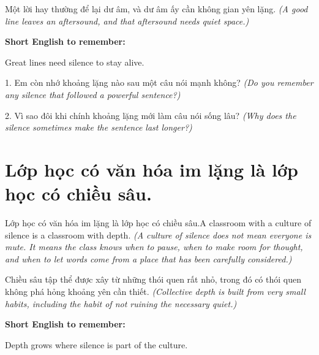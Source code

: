 \begin{baihoc}
Một lời hay thường để lại dư âm, và dư âm ấy cần không gian yên lặng.
\textit{(A good line leaves an aftersound, and that aftersound needs quiet space.)}
\end{baihoc}

\begin{ghinhoanh}
\textbf{Short English to remember:}

Great lines need silence to stay alive.

\end{ghinhoanh}

\begin{tuhocnhanh}
1. Em còn nhớ khoảng lặng nào sau một câu nói mạnh không? \textit{(Do you remember any silence that followed a powerful sentence?)}

2. Vì sao đôi khi chính khoảng lặng mới làm câu nói sống lâu? \textit{(Why does the silence sometimes make the sentence last longer?)}
\end{tuhocnhanh}
\ngancach


\section{Lớp học có văn hóa im lặng là lớp học có chiều sâu.}
\begin{truyen}{Lớp học có văn hóa im lặng là lớp học có chiều sâu.}{A classroom with a culture of silence is a classroom with depth.}
\textit{(A culture of silence does not mean everyone is mute. It means the class knows when to pause, when to make room for thought, and when to let words come from a place that has been carefully considered.)}
\end{truyen}

\begin{baihoc}
Chiều sâu tập thể được xây từ những thói quen rất nhỏ, trong đó có thói quen không phá hỏng khoảng yên cần thiết.
\textit{(Collective depth is built from very small habits, including the habit of not ruining the necessary quiet.)}
\end{baihoc}

\begin{ghinhoanh}
\textbf{Short English to remember:}

Depth grows where silence is part of the culture.

\end{ghinhoanh}

